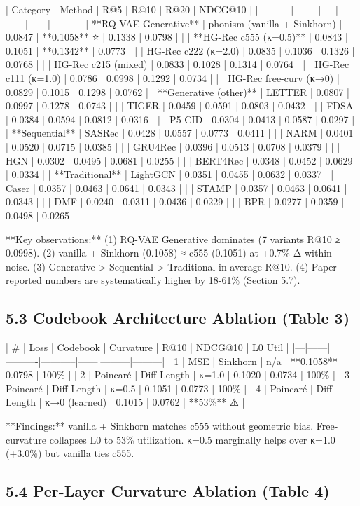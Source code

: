 \documentclass[11pt]{article}
\begin{document}
| Category | Method | R@5 | R@10 | R@20 | NDCG@10 |
|----------|--------|-----|------|------|---------|
| **RQ-VAE Generative** | phonism (vanilla + Sinkhorn) | 0.0847 | **0.1058** ⭐ | 0.1338 | 0.0798 |
| | **HG-Rec c555 (κ=0.5)** | 0.0843 | 0.1051 | **0.1342** | 0.0773 |
| | HG-Rec c222 (κ=2.0) | 0.0835 | 0.1036 | 0.1326 | 0.0768 |
| | HG-Rec c215 (mixed) | 0.0833 | 0.1028 | 0.1314 | 0.0764 |
| | HG-Rec c111 (κ=1.0) | 0.0786 | 0.0998 | 0.1292 | 0.0734 |
| | HG-Rec free-curv (κ→0) | 0.0829 | 0.1015 | 0.1298 | 0.0762 |
| **Generative (other)** | LETTER | 0.0807 | 0.0997 | 0.1278 | 0.0743 |
| | TIGER | 0.0459 | 0.0591 | 0.0803 | 0.0432 |
| | FDSA | 0.0384 | 0.0594 | 0.0812 | 0.0316 |
| | P5-CID | 0.0304 | 0.0413 | 0.0587 | 0.0297 |
| **Sequential** | SASRec | 0.0428 | 0.0557 | 0.0773 | 0.0411 |
| | NARM | 0.0401 | 0.0520 | 0.0715 | 0.0385 |
| | GRU4Rec | 0.0396 | 0.0513 | 0.0708 | 0.0379 |
| | HGN | 0.0302 | 0.0495 | 0.0681 | 0.0255 |
| | BERT4Rec | 0.0348 | 0.0452 | 0.0629 | 0.0334 |
| **Traditional** | LightGCN | 0.0351 | 0.0455 | 0.0632 | 0.0337 |
| | Caser | 0.0357 | 0.0463 | 0.0641 | 0.0343 |
| | STAMP | 0.0357 | 0.0463 | 0.0641 | 0.0343 |
| | DMF | 0.0240 | 0.0311 | 0.0436 | 0.0229 |
| | BPR | 0.0277 | 0.0359 | 0.0498 | 0.0265 |

**Key observations:** (1) RQ-VAE Generative dominates (7 variants R@10 ≥ 0.0998). (2) vanilla + Sinkhorn (0.1058) ≈ c555 (0.1051) at +0.7\% Δ within noise. (3) Generative > Sequential > Traditional in average R@10. (4) Paper-reported numbers are systematically higher by 18-61\% (Section 5.7).


\subsection{5.3 Codebook Architecture Ablation (Table 3)}

| \# | Loss | Codebook | Curvature | R@10 | NDCG@10 | L0 Util |
|---|------|----------|-----------|------|---------|---------|
| 1 | MSE | Sinkhorn | n/a | **0.1058** | 0.0798 | 100\% |
| 2 | Poincaré | Diff-Length | κ=1.0 | 0.1020 | 0.0734 | 100\% |
| 3 | Poincaré | Diff-Length | κ=0.5 | 0.1051 | 0.0773 | 100\% |
| 4 | Poincaré | Diff-Length | κ→0 (learned) | 0.1015 | 0.0762 | **53\%** ⚠️ |

**Findings:** vanilla + Sinkhorn matches c555 without geometric bias. Free-curvature collapses L0 to 53\% utilization. κ=0.5 marginally helps over κ=1.0 (+3.0\%) but vanilla ties c555.


\subsection{5.4 Per-Layer Curvature Ablation (Table 4)}
\end{document}
